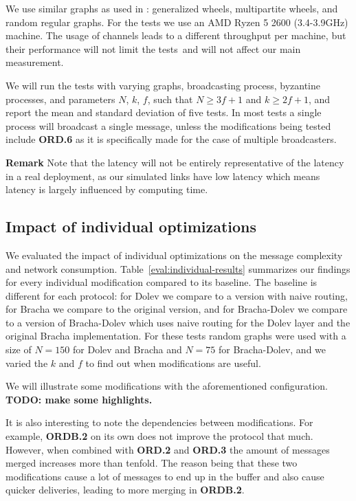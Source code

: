We use similar graphs as used in \cite{bonomi2021practical,bonomi2019multihop}: generalized wheels, multipartite wheels, and random regular graphs. For the tests we use an AMD Ryzen 5 2600 (3.4-3.9GHz) machine. The usage of channels leads to a different throughput per machine, but their performance will not limit the tests~\citationneeded and will not affect our main measurement.

We will run the tests with varying graphs, broadcasting process, byzantine processes, and parameters $N$, $k$, $f$, such that $N \ge 3f+1$ and $k \ge 2f+1$, and report the mean and standard deviation of five tests. In most tests a single process will broadcast a single message, unless the modifications being tested include \textbf{ORD.6} as it is specifically made for the case of multiple broadcasters.

\textbf{Remark}
Note that the latency will not be entirely representative of the latency in a real deployment, as our simulated links have low latency which means latency is largely influenced by computing time. 

\subsection{Impact of individual optimizations}
We evaluated the impact of individual optimizations on the message complexity and network consumption. Table~\ref{eval:individual-results} summarizes our findings for every individual modification compared to its baseline. The baseline is different for each protocol: for Dolev we compare to a version with naive routing, for Bracha we compare to the original version, and for Bracha-Dolev we compare to a version of Bracha-Dolev which uses naive routing for the Dolev layer and the original Bracha implementation. For these tests random graphs were used with a size of $N=150$ for Dolev and Bracha and $N=75$ for Bracha-Dolev, and we varied the $k$ and $f$ to find out when modifications are useful. 

We will illustrate some modifications with the aforementioned configuration. \textbf{TODO: make some highlights.}

It is also interesting to note the dependencies between modifications. For example, \textbf{ORDB.2} on its own does not improve the protocol that much. However, when combined with \textbf{ORD.2} and \textbf{ORD.3} the amount of messages merged increases more than tenfold. The reason being that these two modifications cause a lot of messages to end up in the buffer and also cause quicker deliveries, leading to more merging in \textbf{ORDB.2}.

